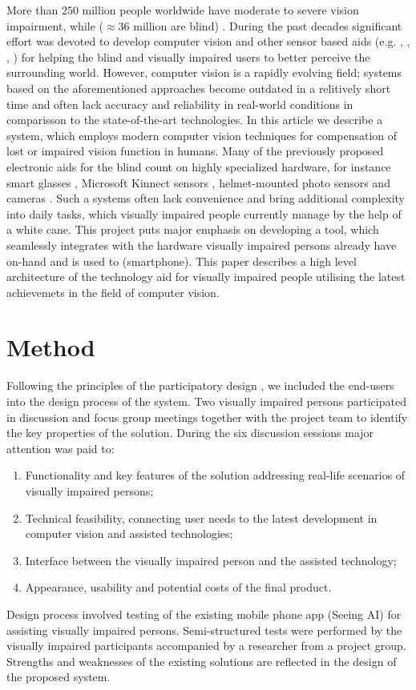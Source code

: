 \documentclass[10pt,conference,compsocconf]{IEEEtran}
\begin{document}
More than $250$ million people worldwide have moderate to severe vision impairment, while ($\approx 36$ million are blind) \cite{Bourne}. During the past decades significant effort was devoted to develop computer vision and other sensor based aids (e.g. \cite{Caraiman}, \cite{Csapo}, \cite{Poggi}, \cite{Zientara}) for helping the blind and visually impaired users to better perceive the surrounding world. However, computer vision is a rapidly evolving field; systems based on the aforementioned approaches become outdated in a relitively short time and often lack accuracy and reliability in real-world conditions in comparisson to the state-of-the-art technologies. In this article we describe a system, which employs modern computer vision techniques for compensation of lost or impaired vision function in humans. Many of the previously proposed electronic aids for the blind count on highly specialized hardware, for instance smart glasses \cite{Zientara}, Microsoft Kinnect sensors \cite{Owayjan}, helmet-mounted photo sensors and cameras \cite{Dunai}. Such a systems often lack convenience and bring additional complexity into daily tasks, which visually impaired people currently manage by the help of a white cane. This project puts major emphasis on developing a tool, which seamlessly integrates with the hardware visually impaired persons already have on-hand and is used to (smartphone). This paper describes a high level architecture of the technology aid for visually impaired people utilising the latest achievemets in the field of computer vision. 


\section{Method}
\label{sec:method}

Following the principles of the participatory design \cite{Kensing}, \cite{Carroll} we included the end-users into the design process of the system. Two visually impaired persons participated in discussion and focus group meetings together with the project team to identify the key properties of the solution. During the six discussion sessions major attention was paid to:
\begin{enumerate}
\item Functionality and key features of the solution addressing real-life scenarios of visually impaired persons;
\item Technical feasibility, connecting user needs to the latest development in computer vision and assisted technologies;
\item Interface between the visually impaired person and the assisted technology;
\item Appearance, usability and potential costs of the final product. 
\end{enumerate}
Design process involved testing of the existing mobile phone app (Seeing AI) for assisting visually impaired persons. Semi-structured tests were performed by the visually impaired participants accompanied by a researcher from a project group. Strengths and weaknesses of the existing solutions are reflected in the design of the proposed system. 
\end{document}
